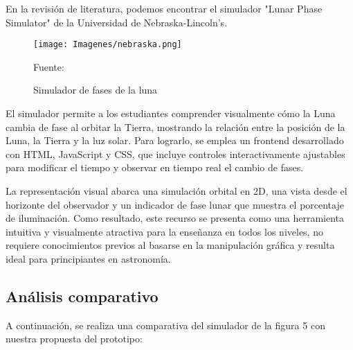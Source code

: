 En la revisión de literatura, podemos encontrar el simulador 
"Lunar Phase Simulator" de la Universidad de Nebraska-Lincoln’s. \cite{Ucar2014}

\begin{figure}[h]
    \texttt{[image: Imagenes/nebraska.png]}
    \centering
    \caption{Simulador de fases de la luna}{Fuente: \cite{UNL2025}}
\end{figure}

\vspace{2em}
El simulador permite a los estudiantes comprender visualmente cómo la Luna cambia de fase al orbitar la Tierra, mostrando la relación entre la posición de la Luna, la Tierra y la luz solar. Para lograrlo, se emplea un frontend desarrollado con HTML, JavaScript y CSS, que incluye controles interactivamente ajustables para modificar el tiempo y observar en tiempo real el cambio de fases.

La representación visual abarca una simulación orbital en 2D, una vista desde el horizonte del observador y un indicador de fase lunar que muestra el porcentaje de iluminación. Como resultado, este recurso se presenta como una herramienta intuitiva y visualmente atractiva para la enseñanza en todos los niveles, no requiere conocimientos previos al basarse en la manipulación gráfica y resulta ideal para principiantes en astronomía.

\subsection*{Análisis comparativo}

A continuación, se realiza una comparativa del simulador de la figura 5 con nuestra propuesta del prototipo:

